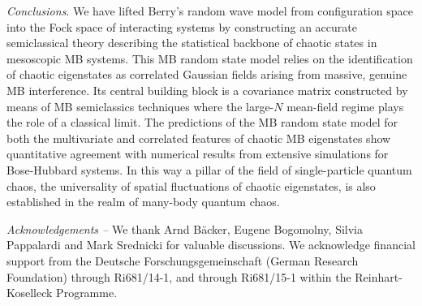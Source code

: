 \documentclass[prl,a4paper,twocolumn,superscriptaddress,floatfix]{revtex4-1}%
\begin{document}
{\it Conclusions}. We have lifted Berry's random wave model from configuration space into the Fock space of interacting systems by constructing an accurate semiclassical theory describing the statistical backbone of chaotic states in mesoscopic MB systems. This MB random state model relies on the identification of chaotic eigenstates as correlated Gaussian fields arising from massive, genuine MB interference. Its central building block is a covariance matrix constructed by means of MB semiclassics techniques where the large-$N$ mean-field regime plays the role of a classical limit. 
The predictions of the MB random state model for both the multivariate and correlated features of chaotic MB eigenstates
show quantitative agreement with numerical results from 
extensive simulations for Bose-Hubbard systems. 
In this way a pillar of the field of single-particle quantum chaos, the universality of spatial fluctuations of chaotic eigenstates, is also established in the realm of many-body quantum chaos.

{\em Acknowledgements --} We thank Arnd B\"acker, Eugene Bogomolny,  Silvia Pappalardi and Mark Srednicki for valuable discussions. We acknowledge financial support from the Deutsche Forschungsgemeinschaft (German Research Foundation) through Ri681/14-1, and through Ri681/15-1 within the Reinhart-Koselleck Programme.


\end{document}
